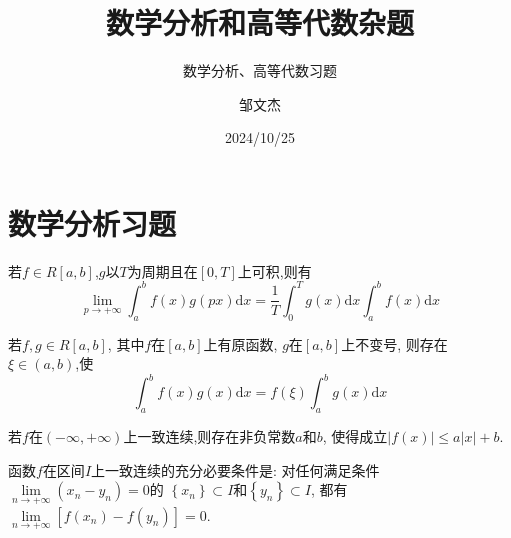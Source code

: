 \documentclass[lang=cn,newtx,10pt,scheme=chinese]{../Template/elegantbook}
\title{数学分析和高等代数杂题}
\subtitle{数学分析、高等代数习题}
\author{邹文杰}
\institute{无}
\date{2024/10/25}
\begin{document}
\maketitle
\frontmatter

\tableofcontents

\mainmatter%


\chapter{数学分析习题}

\begin{lemma}[Riemann 引理] \label{thm:Riemann}
若$f\in R\left[ a,b \right] $,$g$以$T$为周期且在$\left[ 0,T \right] $上可积,则有
\begin{equation}
\underset{p\rightarrow +\infty}{\lim}\int_a^b{f\left( x \right) g\left( px \right) \mathrm{d}x=\frac{1}{T}}\int_0^T{g\left( x \right) \mathrm{d}x}\int_a^b{f\left( x \right) \mathrm{d}x}
\end{equation}
\end{lemma}

\begin{theorem}[积分第一中值定理的推广] \label{thm:JFdyZZ}
若$f,g\in R\left[ a,b \right] $,
其中$f$在$\left[ a,b \right] $上有原函数,
$g$在$\left[ a,b \right] $上不变号,
则存在$\xi \in \left( a,b \right) $,使
\begin{equation}
\int_a^b{f\left( x \right) g\left( x \right) \mathrm{d}x}=f\left( \xi \right) \int_a^b{g\left( x \right) \mathrm{d}x}
\end{equation}
\end{theorem}

\begin{proposition} \label{pro:YZLXHS}
若$f$在$\left( -\infty ,+\infty \right) $上一致连续,则存在非负常数$a$和$b$,
使得成立$\left| f\left( x \right) \right|\leqslant a\left| x \right|+b$.
\end{proposition}

\begin{proposition} \label{pro:HSYZLXCYTJ}
函数$f$在区间$I$上一致连续的充分必要条件是:
对任何满足条件$\underset{n\rightarrow +\infty}{\lim}\left( x_n-y_n \right) =0$的
$\left\{ x_n \right\} \subset I$和$\left\{ y_n \right\} \subset I$,
都有$\underset{n\rightarrow +\infty}{\lim}\left[ f\left( x_n \right) -f\left( y_n \right) \right] =0$.
\end{proposition}


\newpage
\end{document}
